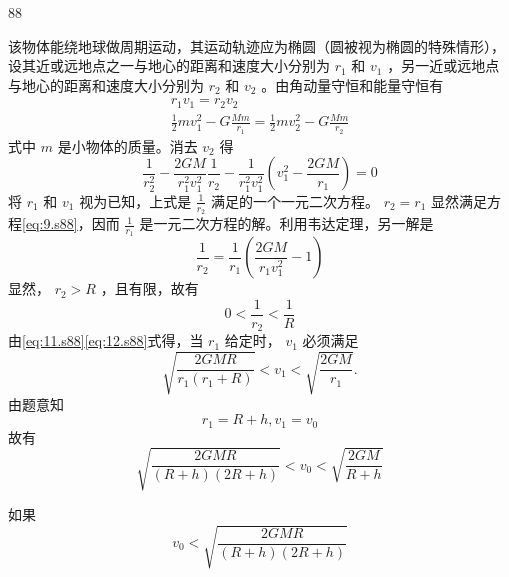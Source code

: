 \begin{solution}{88}
\begin{subsolution}
该物体能绕地球做周期运动，其运动轨迹应为椭圆（圆被视为椭圆的特殊情形），设其近或远地点之一与地心的距离和速度大小分别为 $r_{1}$ 和 $v_{1}$ ，另一近或远地点与地心的距离和速度大小分别为 $r_{2}$ 和 $v_{2}$ 。由角动量守恒和能量守恒有
\begin{equation}
\begin{array}{l} r _ {1} v _ {1} = r _ {2} v _ {2} \\ \frac {1}{2} m v _ {1} ^ {2} - G \frac {M m}{r _ {1}} = \frac {1}{2} m v _ {2} ^ {2} - G \frac {M m}{r _ {2}} \end{array}
\label{eq:9.s88}
\end{equation}
式中 $m$ 是小物体的质量。消去 $v_{2}$ 得
\begin{equation}
\frac {1}{r _ {2} ^ {2}} - \frac {2 G M}{r _ {1} ^ {2} v _ {1} ^ {2}} \frac {1}{r _ {2}} - \frac {1}{r _ {1} ^ {2} v _ {1} ^ {2}} \left(v _ {1} ^ {2} - \frac {2 G M}{r _ {1}}\right) = 0
\label{eq:10.s88}
\end{equation}
将 $r_1$ 和 $v_1$ 视为已知，上式是 $\frac{1}{r_2}$ 满足的一个一元二次方程。 $r_2 = r_1$ 显然满足方程\eqref{eq:9.s88}，因而 $\frac{1}{r_1}$ 是一元二次方程的解。利用韦达定理，另一解是
\begin{equation}
\frac {1}{r _ {2}} = \frac {1}{r _ {1}} \left(\frac {2 G M}{r _ {1} v _ {1} ^ {2}} - 1\right)
\label{eq:11.s88}
\end{equation}
显然， $r_2 > R$ ，且有限，故有
\begin{equation}
0 <   \frac {1}{r _ {2}} <   \frac {1}{R}
\label{eq:12.s88}
\end{equation}
由\eqref{eq:11.s88}\eqref{eq:12.s88}式得，当 $r_{1}$ 给定时， $v_{1}$ 必须满足
\begin{equation}
\sqrt {\frac {2 G M R}{r _ {1} \left(r _ {1} + R\right)}} <   v _ {1} <   \sqrt {\frac {2 G M}{r _ {1}}}.
\label{eq:13.s88}
\end{equation}
由题意知
\begin{equation}
r _ {1} = R + h, v _ {1} = v _ {0}
\label{eq:14.s88}
\end{equation}
故有
\begin{equation}
\sqrt {\frac {2 G M R}{(R + h) (2 R + h)}} <   v _ {0} <   \sqrt {\frac {2 G M}{R + h}}
\label{eq:15.s88}
\end{equation}
\end{subsolution}
\begin{subsolution}
如果
\begin{equation}
v _ {0} <   \sqrt {\frac {2 G M R}{(R + h) (2 R + h)}}
\label{eq:16.s88}
\end{equation}

\end{subsolution}
\end{solution}
